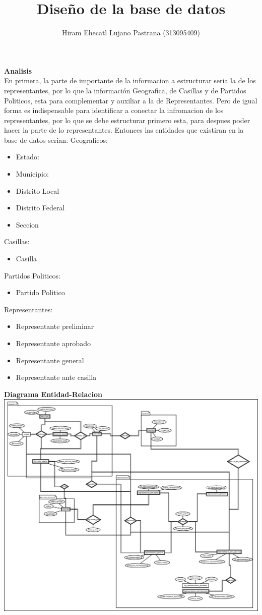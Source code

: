 \documentclass[a4paper,twoside,11pt]{article}
\title{Diseño de la base de datos}
\author{Hiram Ehecatl Lujano Pastrana (313095409)}
\begin{document}
\maketitle

\textbf{Analisis}\\
En primera, la parte de importante de la informacion a estructurar seria
la de los representantes, por lo que la información Geografica, de
Casillas y de Partidos Politicos, esta para complementar y auxiliar
a la de Representantes.
Pero de igual forma es indispensable para identificar a conectar la
infromacion de los representantes, por lo que se debe estructurar primero
esta, para despues poder hacer la parte de lo representantes.
Entonces las entidades que existiran en la base de datos serian:
Geograficos:
\begin{itemize}
  \item Estado:
  \item Municipio:
  \item Distrito Local
  \item Distrito Federal
  \item Seccion
\end{itemize}
Casillas:
\begin{itemize}
  \item Casilla
\end{itemize}
Partidos Politicos:
\begin{itemize}
  \item Partido Politico
\end{itemize}
Representantes:
\begin{itemize}
  \item Representante preliminar
  \item Representante aprobado
  \item Representante general
  \item Representante ante casilla
\end{itemize}
\textbf{Diagrama Entidad-Relacion}\\
\includegraphics[scale=0.15]{e-r}
\end{document}
